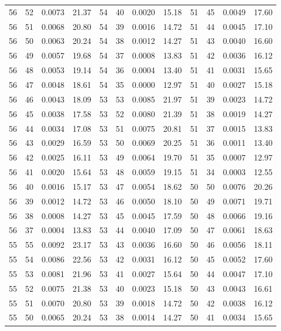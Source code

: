 \begin{tabular}{llll|llll|llll}
56 & 52 & 0.0073 & 21.37 & 54 & 40 & 0.0020 & 15.18 & 51 & 45 & 0.0049 & 17.60\\
56 & 51 & 0.0068 & 20.80 & 54 & 39 & 0.0016 & 14.72 & 51 & 44 & 0.0045 & 17.10\\
56 & 50 & 0.0063 & 20.24 & 54 & 38 & 0.0012 & 14.27 & 51 & 43 & 0.0040 & 16.60\\
56 & 49 & 0.0057 & 19.68 & 54 & 37 & 0.0008 & 13.83 & 51 & 42 & 0.0036 & 16.12\\
56 & 48 & 0.0053 & 19.14 & 54 & 36 & 0.0004 & 13.40 & 51 & 41 & 0.0031 & 15.65\\
56 & 47 & 0.0048 & 18.61 & 54 & 35 & 0.0000 & 12.97 & 51 & 40 & 0.0027 & 15.18\\
56 & 46 & 0.0043 & 18.09 & 53 & 53 & 0.0085 & 21.97 & 51 & 39 & 0.0023 & 14.72\\
56 & 45 & 0.0038 & 17.58 & 53 & 52 & 0.0080 & 21.39 & 51 & 38 & 0.0019 & 14.27\\
56 & 44 & 0.0034 & 17.08 & 53 & 51 & 0.0075 & 20.81 & 51 & 37 & 0.0015 & 13.83\\
56 & 43 & 0.0029 & 16.59 & 53 & 50 & 0.0069 & 20.25 & 51 & 36 & 0.0011 & 13.40\\
56 & 42 & 0.0025 & 16.11 & 53 & 49 & 0.0064 & 19.70 & 51 & 35 & 0.0007 & 12.97\\
56 & 41 & 0.0020 & 15.64 & 53 & 48 & 0.0059 & 19.15 & 51 & 34 & 0.0003 & 12.55\\
56 & 40 & 0.0016 & 15.17 & 53 & 47 & 0.0054 & 18.62 & 50 & 50 & 0.0076 & 20.26\\
56 & 39 & 0.0012 & 14.72 & 53 & 46 & 0.0050 & 18.10 & 50 & 49 & 0.0071 & 19.71\\
56 & 38 & 0.0008 & 14.27 & 53 & 45 & 0.0045 & 17.59 & 50 & 48 & 0.0066 & 19.16\\
56 & 37 & 0.0004 & 13.83 & 53 & 44 & 0.0040 & 17.09 & 50 & 47 & 0.0061 & 18.63\\
55 & 55 & 0.0092 & 23.17 & 53 & 43 & 0.0036 & 16.60 & 50 & 46 & 0.0056 & 18.11\\
55 & 54 & 0.0086 & 22.56 & 53 & 42 & 0.0031 & 16.12 & 50 & 45 & 0.0052 & 17.60\\
55 & 53 & 0.0081 & 21.96 & 53 & 41 & 0.0027 & 15.64 & 50 & 44 & 0.0047 & 17.10\\
55 & 52 & 0.0075 & 21.38 & 53 & 40 & 0.0023 & 15.18 & 50 & 43 & 0.0043 & 16.61\\
55 & 51 & 0.0070 & 20.80 & 53 & 39 & 0.0018 & 14.72 & 50 & 42 & 0.0038 & 16.12\\
55 & 50 & 0.0065 & 20.24 & 53 & 38 & 0.0014 & 14.27 & 50 & 41 & 0.0034 & 15.65\\

\end{tabular}
